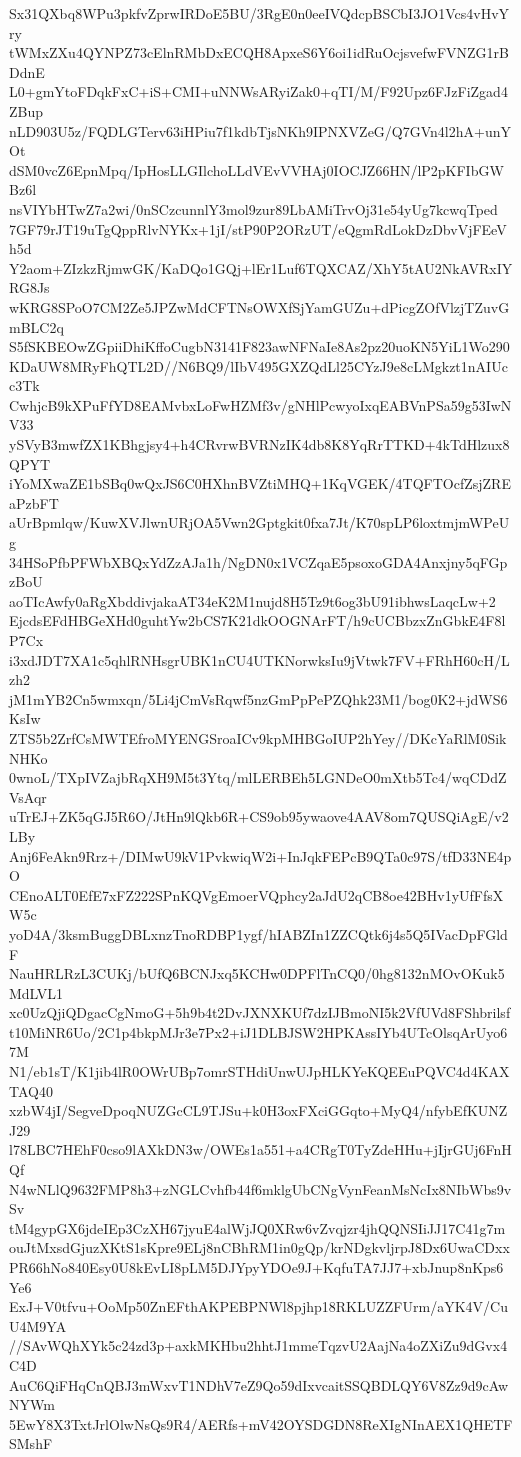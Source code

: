 Sx31QXbq8WPu3pkfvZprwIRDoE5BU/3RgE0n0eeIVQdcpBSCbI3JO1Vcs4vHvYry
tWMxZXu4QYNPZ73cElnRMbDxECQH8ApxeS6Y6oi1idRuOcjsvefwFVNZG1rBDdnE
L0+gmYtoFDqkFxC+iS+CMI+uNNWsARyiZak0+qTI/M/F92Upz6FJzFiZgad4ZBup
nLD903U5z/FQDLGTerv63iHPiu7f1kdbTjsNKh9IPNXVZeG/Q7GVn4l2hA+unYOt
dSM0vcZ6EpnMpq/IpHosLLGIlchoLLdVEvVVHAj0IOCJZ66HN/lP2pKFIbGWBz6l
nsVIYbHTwZ7a2wi/0nSCzcunnlY3mol9zur89LbAMiTrvOj31e54yUg7kcwqTped
7GF79rJT19uTgQppRlvNYKx+1jI/stP90P2ORzUT/eQgmRdLokDzDbvVjFEeVh5d
Y2aom+ZIzkzRjmwGK/KaDQo1GQj+lEr1Luf6TQXCAZ/XhY5tAU2NkAVRxIYRG8Js
wKRG8SPoO7CM2Ze5JPZwMdCFTNsOWXfSjYamGUZu+dPicgZOfVlzjTZuvGmBLC2q
S5fSKBEOwZGpiiDhiKffoCugbN3141F823awNFNaIe8As2pz20uoKN5YiL1Wo290
KDaUW8MRyFhQTL2D//N6BQ9/lIbV495GXZQdLl25CYzJ9e8cLMgkzt1nAIUcc3Tk
CwhjcB9kXPuFfYD8EAMvbxLoFwHZMf3v/gNHlPcwyoIxqEABVnPSa59g53IwNV33
ySVyB3mwfZX1KBhgjsy4+h4CRvrwBVRNzIK4db8K8YqRrTTKD+4kTdHlzux8QPYT
iYoMXwaZE1bSBq0wQxJS6C0HXhnBVZtiMHQ+1KqVGEK/4TQFTOcfZsjZREaPzbFT
aUrBpmlqw/KuwXVJlwnURjOA5Vwn2Gptgkit0fxa7Jt/K70spLP6loxtmjmWPeUg
34HSoPfbPFWbXBQxYdZzAJa1h/NgDN0x1VCZqaE5psoxoGDA4Anxjny5qFGpzBoU
aoTIcAwfy0aRgXbddivjakaAT34eK2M1nujd8H5Tz9t6og3bU91ibhwsLaqcLw+2
EjcdsEFdHBGeXHd0guhtYw2bCS7K21dkOOGNArFT/h9cUCBbzxZnGbkE4F8lP7Cx
i3xdJDT7XA1c5qhlRNHsgrUBK1nCU4UTKNorwksIu9jVtwk7FV+FRhH60cH/Lzh2
jM1mYB2Cn5wmxqn/5Li4jCmVsRqwf5nzGmPpPePZQhk23M1/bog0K2+jdWS6KsIw
ZTS5b2ZrfCsMWTEfroMYENGSroaICv9kpMHBGoIUP2hYey//DKcYaRlM0SikNHKo
0wnoL/TXpIVZajbRqXH9M5t3Ytq/mlLERBEh5LGNDeO0mXtb5Tc4/wqCDdZVsAqr
uTrEJ+ZK5qGJ5R6O/JtHn9lQkb6R+CS9ob95ywaove4AAV8om7QUSQiAgE/v2LBy
Anj6FeAkn9Rrz+/DIMwU9kV1PvkwiqW2i+InJqkFEPcB9QTa0c97S/tfD33NE4pO
CEnoALT0EfE7xFZ222SPnKQVgEmoerVQphcy2aJdU2qCB8oe42BHv1yUfFfsXW5c
yoD4A/3ksmBuggDBLxnzTnoRDBP1ygf/hIABZIn1ZZCQtk6j4s5Q5IVacDpFGldF
NauHRLRzL3CUKj/bUfQ6BCNJxq5KCHw0DPFlTnCQ0/0hg8132nMOvOKuk5MdLVL1
xc0UzQjiQDgacCgNmoG+5h9b4t2DvJXNXKUf7dzIJBmoNI5k2VfUVd8FShbrilsf
t10MiNR6Uo/2C1p4bkpMJr3e7Px2+iJ1DLBJSW2HPKAssIYb4UTcOlsqArUyo67M
N1/eb1sT/K1jib4lR0OWrUBp7omrSTHdiUnwUJpHLKYeKQEEuPQVC4d4KAXTAQ40
xzbW4jI/SegveDpoqNUZGcCL9TJSu+k0H3oxFXciGGqto+MyQ4/nfybEfKUNZJ29
l78LBC7HEhF0cso9lAXkDN3w/OWEs1a551+a4CRgT0TyZdeHHu+jIjrGUj6FnHQf
N4wNLlQ9632FMP8h3+zNGLCvhfb44f6mklgUbCNgVynFeanMsNcIx8NIbWbs9vSv
tM4gypGX6jdeIEp3CzXH67jyuE4alWjJQ0XRw6vZvqjzr4jhQQNSIiJJ17C41g7m
ouJtMxsdGjuzXKtS1sKpre9ELj8nCBhRM1in0gQp/krNDgkvljrpJ8Dx6UwaCDxx
PR66hNo840Esy0U8kEvLI8pLM5DJYpyYDOe9J+KqfuTA7JJ7+xbJnup8nKps6Ye6
ExJ+V0tfvu+OoMp50ZnEFthAKPEBPNWl8pjhp18RKLUZZFUrm/aYK4V/CuU4M9YA
//SAvWQhXYk5c24zd3p+axkMKHbu2hhtJ1mmeTqzvU2AajNa4oZXiZu9dGvx4C4D
AuC6QiFHqCnQBJ3mWxvT1NDhV7eZ9Qo59dIxvcaitSSQBDLQY6V8Zz9d9cAwNYWm
5EwY8X3TxtJrlOlwNsQs9R4/AERfs+mV42OYSDGDN8ReXIgNInAEX1QHETFSMshF
